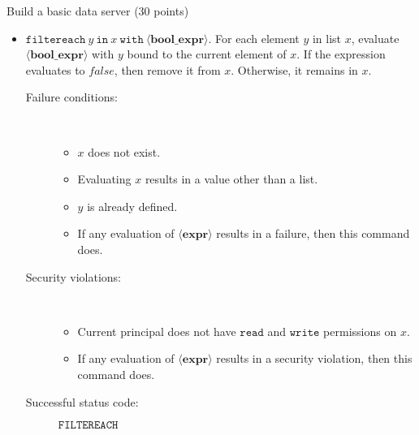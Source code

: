 \documentclass[11pt]{article}
\newcommand{\false}{\ensuremath{\mathit{false}}\xspace}
\begin{document}
\begin{problem}{Build a basic data server (30 points)}
\begin{itemize}
\item $\mathtt{filtereach}\ \mathit{y}\ \mathtt{in}\ \mathit{x}\ \mathtt{with}\ \langle\mathbf{bool\_expr}\rangle$. For each element $y$ in list $x$, evaluate $\langle\mathbf{bool\_expr}\rangle$ with $y$ bound to the current element of $x$. If the expression evaluates to \false, then remove it from $x$. Otherwise, it remains in $x$.
\begin{description}
\item[Failure conditions:]\ \\[-1.5em]
\begin{itemize}
\item $x$ does not exist.
\item Evaluating $x$ results in a value other than a list.
\item $y$ is already defined.
\item If any evaluation of $\langle\mathbf{expr}\rangle$ results in a failure, then this command does.
\end{itemize}
\item[Security violations:]\ \\[-1.5em]
\begin{itemize}
\item Current principal does not have $\mathtt{read}$ and $\mathtt{write}$ permissions on $x$.
\item If any evaluation of $\langle\mathbf{expr}\rangle$ results in a security violation, then this command does.
\end{itemize}
\item[Successful status code:] $\mathtt{FILTEREACH}$
\end{description}

\end{itemize}


\end{problem}
\end{document}

